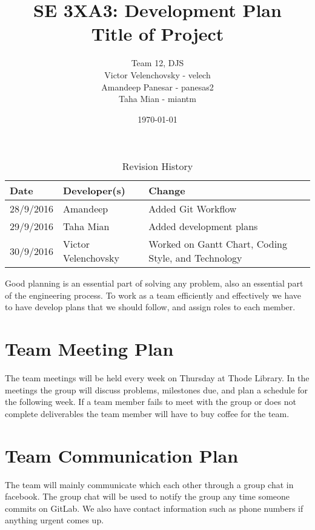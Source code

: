 \documentclass{article}
\title{SE 3XA3: Development Plan\\Title of Project}
\author{Team 12, DJS
		\\ Victor Velenchovsky - velech
		\\ Amandeep Panesar - panesas2
		\\ Taha Mian - miantm
}
\date{\today}
\begin{document}
\begin{table}[hp]
\caption{Revision History} \label{TblRevisionHistory}
\begin{tabularx}{\textwidth}{llX}
\toprule
\textbf{Date} & \textbf{Developer(s)} & \textbf{Change}\\
\midrule
28/9/2016 & Amandeep & Added Git Workflow\\
29/9/2016 & Taha Mian & Added development plans\\
30/9/2016 & Victor Velenchovsky  & Worked on Gantt Chart, Coding Style, and Technology \\
\bottomrule
\end{tabularx}
\end{table}

\newpage

\maketitle

Good planning is an essential part of solving any problem, also an essential part of the engineering process. To work as a team efficiently and effectively we have to have develop plans that we should follow, and assign roles to each member.

\section{Team Meeting Plan}
The team meetings will be held every week on Thursday at Thode Library. In the meetings the group will discuss problems, milestones due, and plan a schedule for the following week. If a team member fails to meet with the group or does not complete deliverables the team member will have to buy coffee for the team.
\section{Team Communication Plan}
The team will mainly communicate which each other through a group chat in facebook. The group chat will be used to notify the group any time someone commits on GitLab. We also have contact information such as phone numbers if anything urgent comes up.
\end{document}
